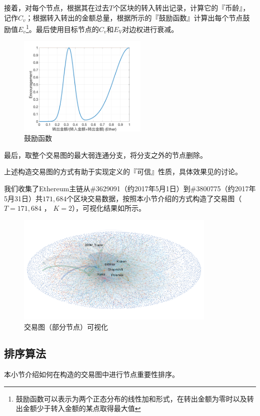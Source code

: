 接着，对每个节点，根据其在过去$T$个区块的转入转出记录，计算它的『币龄』，记作$C_v$；根据转入转出的金额总量，根据所示的『鼓励函数』计算出每个节点鼓励值$E_v$\footnote{鼓励函数可以表示为两个正态分布的线性加和形式，在转出金额为零时以及转出金额少于转入金额的某点取得最大值}。最后使用目标节点的$C_v$和$E_V$对边权进行衰减。

\begin{figure}[h]
\centering
	\includegraphics[width=0.55\textwidth]{figs/encouragement.png}
	\caption{鼓励函数}\label{fig:encouragement}
\end{figure}


最后，取整个交易图的最大弱连通分支，将分支之外的节点删除。

上述构造交易图的方式有助于实现定义的『可信』性质，具体效果见的讨论。

我们收集了Ethereum主链从\#3629091（约2017年5月1日）到\#3800775（约2017年5月31日）共$171,684$个区块交易数据，按照本小节介绍的方式构造了交易图（$T=171,684$ ， $K=2$），可视化结果如所示。

\begin{figure}[h]
	\centering
	\includegraphics[width=0.85\textwidth]{figs/wgc.png}
	\caption{交易图（部分节点）可视化}\label{fig:wgc}
\end{figure}


\subsection{排序算法} \label{subsec:leaderrank}
本小节介绍如何在构造的交易图中进行节点重要性排序。

